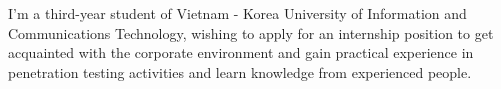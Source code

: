 

\begin{cvparagraph}

I'm a third-year student of Vietnam - Korea University of Information and
Communications Technology, wishing to apply for an internship position to get
acquainted with the corporate environment and gain practical experience in
penetration testing activities and learn knowledge from experienced people.
\end{cvparagraph}
